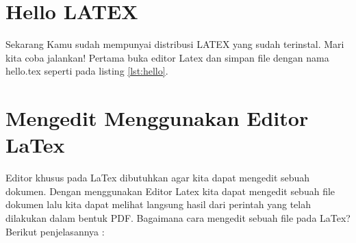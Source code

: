 \section{Hello LATEX}
Sekarang Kamu sudah mempunyai distribusi LATEX yang sudah terinstal. Mari kita coba jalankan! Pertama buka editor Latex dan simpan file dengan nama hello.tex seperti pada listing \ref{lst:hello}.
\cite{kline2018latex}

\section{Mengedit Menggunakan Editor LaTex}
Editor khusus pada LaTex dibutuhkan agar kita dapat mengedit sebuah dokumen. Dengan menggunakan Editor Latex kita dapat mengedit sebuah file dokumen lalu kita dapat melihat langsung hasil dari perintah yang telah dilakukan dalam bentuk PDF. Bagaimana cara mengedit sebuah file pada LaTex? Berikut penjelasannya : 
